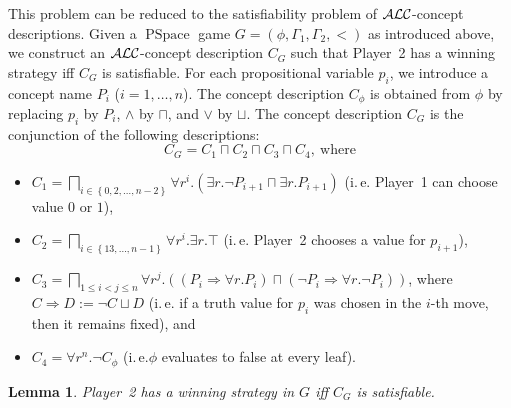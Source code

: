 \documentclass[openany]{scrbook}
\theoremstyle{break}
\newtheorem{Lemma}[Theorem]{Lemma}
\theoremstyle{nonumberbreak}
\theoremstyle{nonumberplain}
\theoremstyle{nonumberbreak}
\newcommand{\then}{\Longrightarrow}
\newcommand{\set}[1]{\left\{#1\right\}}
\newcommand{\ie}{i{.}\,e{.}\xspace}
\newcommand{\ALC}{{\cal A}{\cal L}{\cal C}}
\newcommand{\PSpace}{\operatorname{PSpace}}
\begin{document}
This problem can be reduced to the satisfiability problem of
$\ALC$-concept descriptions. Given a $\PSpace$ game $G = (\phi,
\Gamma_1, \Gamma_2, <)$ as introduced above, we construct an
$\ALC$-concept description $C_G$ such that Player~2 has a winning strategy
iff $C_G$ is satisfiable. For each propositional variable $p_i$, we
introduce a concept name $P_i$ ($i = 1, \dotsc, n$). The concept
description $C_\phi$ is obtained from $\phi$ by replacing $p_i$ by
$P_i$, $\wedge$ by $\sqcap$, and $\vee$ by $\sqcup$. The concept
description $C_G$ is the conjunction of the following descriptions:
\begin{equation*}
  C_G = C_1 \sqcap C_2 \sqcap C_3 \sqcap C_4,\ \text{where}
\end{equation*}
\begin{itemize}
\item $C_1 = \bigsqcap_{i \in \set{0, 2, \dotsc, n - 2}}{\forall
    r^i.\left(\exists r. \neg P_{i + 1} \sqcap \exists r. P_{i + 1}\right)}$ (\ie
  Player~1 can choose value $0$ or $1$),
\item $C_2 = \bigsqcap_{i \in \set{1 3, \dotsc, n - 1}}{\forall
    r^i. \exists r. \top}$ (\ie Player~2 chooses a value for $p_{i + 1}$),
\item $C_3 = \bigsqcap_{1 \leq i < j \leq n}{\forall
    r^j. \left(\left(P_i \then \forall r. P_i\right) \sqcap
      \left(\neg P_i \then \forall r. \neg P_i\right)\right)}$, where
  $C \then D := \neg C \sqcup D$ (\ie if a truth value for $p_i$ was
  chosen in the $i$-th move, then it remains fixed), and
\item $C_4 = \forall r^n. \neg C_\phi$ (\ie $\phi$ evaluates to false
  at every leaf).
\end{itemize}

\begin{Lemma}
  \label{6.7}
  Player~2 has a winning strategy in $G$ iff $C_G$ is satisfiable.
\end{Lemma}
\end{document}
